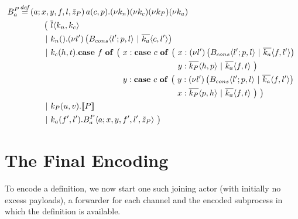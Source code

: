 \begin{align*}
  \adef*{B_a^P}{a}{x,y,f,l,\tilde{z}_P}{\arcv{a}{c,p} . \anew{k_n}{\anew{k_c}{\anew{k_P}{\anew{k_a}{
    \\
    &\hspace{1cm}
    \begin{aligned}[t]
      \big(\ &\asnd{l}{k_n,k_c}
      \\
      \apar  &\arcv{k_n}{} . \anew{l'}{\parens{\ains{B_{cons}}{l'}{p, l} \apar \asnd{k_a}{c, l'}}}
      \\
      \apar  &\arcv{k_c}{h,t} .
        \begin{aligned}[t]
          \acse*{f}{\big(\ 
            &\aalt{x}{
              \begin{aligned}[t]
                \acse*{c}{\big(\ 
                  &\aalt{x}{\anew*{l'}{
                    \ains{B_{cons}}{l'}{p,l} \apar \asnd{k_a}{f,l'}
                  }}\\
                  &\aalt{y}{
                    \asnd{k_P}{h,p} \apar \asnd{k_a}{f,t}
                  }\ 
                \big)}
              \end{aligned}
            }\\
            &\aalt{y}{
              \begin{aligned}[t]
                \acse*{c}{\big(\ 
                  &\aalt{y}{\anew*{l'}{
                    \ains{B_{cons}}{l'}{p,l} \apar \asnd{k_a}{f,l'}
                  }}\\
                  &\aalt{x}{
                    \asnd{k_P}{p,h} \apar \asnd{k_a}{f,t}
                  }\ 
                \big)}
                \ \big)
              \end{aligned}
            }\ 
          }
        \end{aligned}
      \\
      \apar  &\arcv{k_P}{u,v} . \encMJtoAP{P}
      \\
      \apar  &\arcv{k_a}{f',l'} . \ains{B_a^P}{a}{x, y, f', l',\tilde{z}_P}
      \ \big)
    \end{aligned}
  }}}}} \\
\end{align*}

\section{The Final Encoding}

To encode a \joincalc definition,
we now start one such joining actor (with initially no excess payloads),
a forwarder for each channel
and the encoded subprocess in which the definition is available.

